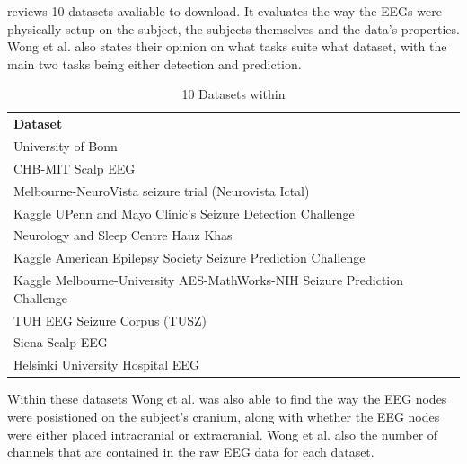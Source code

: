 \documentclass[12pt]{article}
\begin{document}
\cite{wong2023eeg} reviews 10 datasets avaliable to download. It evaluates the way the EEGs were physically setup on the subject, the subjects themselves and the data's properties. Wong et al. also states their opinion on what tasks suite what dataset, with the main two tasks being either detection and prediction. 

\begin{table}[H]
\centering
\begin{tabular}{l}
\textbf{Dataset}                       \\
University of Bonn                   \\
CHB-MIT Scalp EEG                    \\
Melbourne-NeuroVista seizure trial (Neurovista Ictal)                           \\
Kaggle UPenn and Mayo Clinic's Seizure Detection Challenge                     \\
Neurology and Sleep Centre Hauz Khas \\
Kaggle American Epilepsy Society Seizure Prediction Challenge                  \\
Kaggle Melbourne-University AES-MathWorks-NIH Seizure Prediction Challenge \\
TUH EEG Seizure Corpus (TUSZ)        \\
Siena Scalp EEG                      \\
Helsinki University Hospital EEG    
\end{tabular}
\caption{10 Datasets within \protect\cite{wong2023eeg}}
\end{table}

Within these datasets Wong et al. was also able to find the way the EEG nodes were posistioned on the subject's cranium, along with whether the EEG nodes were either placed intracranial or extracranial. Wong et al. also the number of channels that are contained in the raw EEG data for each dataset.
\end{document}
